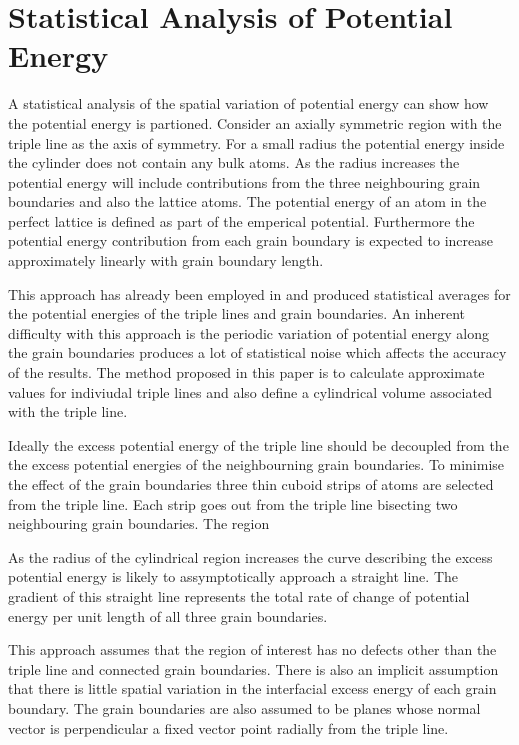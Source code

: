 \documentclass[12pt,a4paper]{book}
\begin{document}
\section{Statistical Analysis of Potential Energy}

A statistical analysis of the spatial variation of potential energy can show how the potential energy is partioned. Consider an axially symmetric region with the triple line as the axis of symmetry. For a small radius the potential energy inside the cylinder does not contain any bulk atoms. As the radius increases the potential energy will include contributions from the three neighbouring grain boundaries and also the lattice atoms. The potential energy of an atom in the perfect lattice is defined as part of the emperical potential. Furthermore the potential energy contribution from each grain boundary is expected to increase approximately linearly with grain boundary length.

This approach has already been employed in \citep{Srinivasan1999}   
and produced statistical averages for the potential energies of the triple lines and grain boundaries. An inherent difficulty with this approach is the periodic variation of potential energy along the grain boundaries produces a lot of statistical noise which affects the accuracy of the results. The method proposed in this paper is to calculate approximate values for indiviudal triple lines and also define a cylindrical volume associated with the triple line.

Ideally the excess potential energy of the triple line should be decoupled from the the excess potential energies of the neighbourning grain boundaries. To minimise the effect of the grain boundaries three thin cuboid strips of atoms are selected from the triple line. Each strip goes out from the triple line bisecting two neighbouring grain boundaries. The region  


As the radius of the cylindrical region increases the curve describing the excess potential energy is likely to assymptotically approach a straight line. The gradient of this straight line represents the total rate of change of potential energy per unit length of all three grain boundaries. 

This approach assumes that the region of interest has no defects other than the triple line and connected grain boundaries. There is also an implicit assumption that there is little spatial variation in the interfacial excess energy of each grain boundary. The grain boundaries are also assumed to be planes whose normal vector is perpendicular a fixed vector point radially from the triple line.
\end{document}
